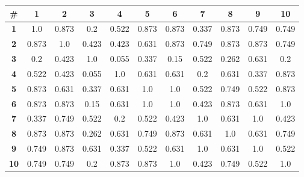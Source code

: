 \begin{table}[H]
\centering
\begin{tabular}{|c|c|c|c|c|c|c|c|c|c|c|}
    \hline
    \textbf{\#}& \textbf{1}& \textbf{2}& \textbf{3}& \textbf{4}& \textbf{5}& \textbf{6}& \textbf{7}& \textbf{8}& \textbf{9}& \textbf{10}\\ \hline
    \textbf{1}  & 1.0 & 0.873 & 0.2 & 0.522 & 0.873 & 0.873 & 0.337 & 0.873 & 0.749 & 0.749\\ \hline
    \textbf{2}  & 0.873 & 1.0 & 0.423 & 0.423 & 0.631 & 0.873 & 0.749 & 0.873 & 0.873 & 0.749\\ \hline
    \textbf{3}  & 0.2 & 0.423 & 1.0 & 0.055 & 0.337 & 0.15 & 0.522 & 0.262 & 0.631 & 0.2\\ \hline
    \textbf{4}  & 0.522 & 0.423 & 0.055 & 1.0 & 0.631 & 0.631 & 0.2 & 0.631 & 0.337 & 0.873\\ \hline
    \textbf{5}  & 0.873 & 0.631 & 0.337 & 0.631 & 1.0 & 1.0 & 0.522 & 0.749 & 0.522 & 0.873\\ \hline
    \textbf{6}  & 0.873 & 0.873 & 0.15 & 0.631 & 1.0 & 1.0 & 0.423 & 0.873 & 0.631 & 1.0\\ \hline
    \textbf{7}  & 0.337 & 0.749 & 0.522 & 0.2 & 0.522 & 0.423 & 1.0 & 0.631 & 1.0 & 0.423\\ \hline
    \textbf{8}  & 0.873 & 0.873 & 0.262 & 0.631 & 0.749 & 0.873 & 0.631 & 1.0 & 0.631 & 0.749\\ \hline
    \textbf{9}  & 0.749 & 0.873 & 0.631 & 0.337 & 0.522 & 0.631 & 1.0 & 0.631 & 1.0 & 0.522\\ \hline
    \textbf{10}  & 0.749 & 0.749 & 0.2 & 0.873 & 0.873 & 1.0 & 0.423 & 0.749 & 0.522 & 1.0\\ \hline
\end{tabular}
\end{table}